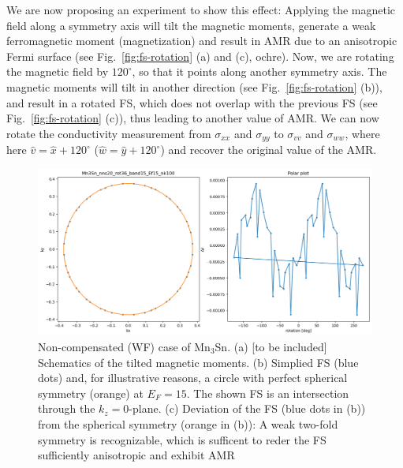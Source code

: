 \documentclass[prb,showpacs,amsmath,amssymb,superscriptaddress,twocolumn,floatfix]{revtex4-1}
\begin{document}
\begin{appendix}
We are now proposing an experiment to show this effect: Applying the magnetic field along a symmetry axis will tilt the magnetic moments, generate a weak ferromagnetic moment (magnetization) and result in AMR due to an anisotropic Fermi surface (see Fig.~\ref{fig:fs-rotation} (a) and (c), ochre). Now, we are rotating the magnetic field by $120^\circ$, so that it points along another symmetry axis. The magnetic moments will tilt in another direction (see Fig.~\ref{fig:fs-rotation} (b)), and result in a rotated FS, which does not overlap with the previous FS (see Fig.~\ref{fig:fs-rotation} (c)), thus leading to another value of AMR. We can now rotate the conductivity measurement from $\sigma_{xx}$ and $\sigma_{yy}$ to $\sigma_{vv}$ and $\sigma_{ww}$, where here $\hat{v} = \hat{x} + 120^\circ$ ($\hat{w} = \hat{y} + 120^\circ$) and recover the original value of the AMR. 

\begin{figure}
        \centering
        \includegraphics[width=\linewidth]{img/Mn3Sn_nns20_rot36_band15_Ef15_nk100}
        \caption{Non-compensated (WF) case of Mn$_3$Sn. {\color{red} (a) [to be included] Schematics of the tilted magnetic moments}. (b) Simplied FS (blue dots) and, for illustrative reasons, a circle with perfect spherical symmetry (orange) at $E_F = 15$. The shown FS is an intersection through the $k_z = 0$-plane. (c) Deviation of the FS (blue dots in (b)) from the spherical symmetry (orange in (b)): A weak two-fold symmetry is recognizable, which is sufficent to reder the FS sufficiently anisotropic and exhibit AMR}
        \label{fig:mn3sn_36deg_FS}
\end{figure}


\end{appendix}

\def\urlprefix{}
\def\url#1{}
\end{document}

